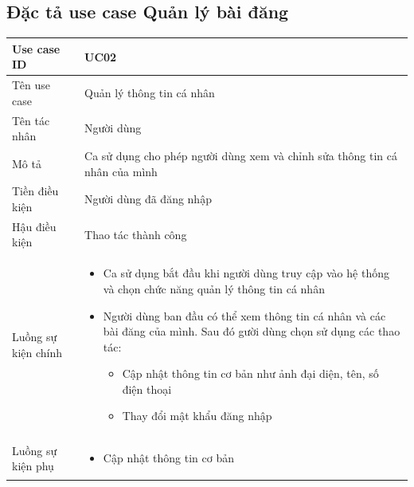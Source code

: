 \documentclass[../DoAn.tex]{subfiles}
\begin{document}
\subsection{Đặc tả use case Quản lý bài đăng
}
\hfill
\begin{table}[H]
\begin{tabular}{|p{3cm}|p{12cm}|}
\hline
Use case ID         & UC02                                                                                                               \\ \hline
Tên use case        & Quản lý thông tin cá nhân                                                                                                   \\ \hline
Tên tác nhân        & Người dùng                                                                                                         \\ \hline
Mô tả               & Ca sử dụng cho phép người dùng xem và chỉnh sửa thông tin cá nhân của mình                                                              \\ \hline
Tiền điều kiện      & Người dùng đã đăng nhập                                                                                                           \\ \hline
Hậu điều kiện       & Thao tác thành công                                                                                                              \\ \hline
Luồng sự kiện chính & 
\begin{itemize}
\item Ca sử dụng bắt đầu khi người dùng truy cập vào hệ thống và chọn chức năng quản lý thông tin cá nhân
\item Người dùng ban đầu có thể xem thông tin cá nhân và các bài đăng của mình. Sau đó gười dùng chọn sử dụng các thao tác:
\begin{itemize}
\item Cập nhật thông tin cơ bản như ảnh đại diện, tên, số điện thoại
\item Thay đổi mật khẩu đăng nhập
\end{itemize}
\end{itemize} \\\hline
Luồng sự kiện phụ   &                                      \begin{itemize}
\item Cập nhật thông tin cơ bản

\end{itemize}
\end{tabular}
\end{table}
\end{document}
